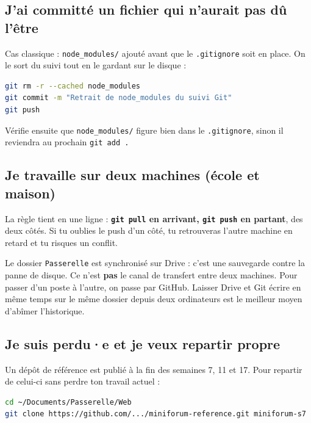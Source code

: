 \documentclass[a4paper,11pt]{article}
\begin{document}
\subsection{J'ai committé un fichier qui n'aurait pas dû l'être}

Cas classique : \texttt{node\_modules/} ajouté avant que le \texttt{.gitignore} soit en place. On le sort du suivi tout en le gardant sur le disque :

\begin{lstlisting}[language=bash]
git rm -r --cached node_modules
git commit -m "Retrait de node_modules du suivi Git"
git push
\end{lstlisting}

Vérifie ensuite que \texttt{node\_modules/} figure bien dans le \texttt{.gitignore}, sinon il reviendra au prochain \texttt{git add .}

\subsection{Je travaille sur deux machines (école et maison)}

La règle tient en une ligne : \textbf{\texttt{git pull} en arrivant, \texttt{git push} en partant}, des deux côtés. Si tu oublies le push d'un côté, tu retrouveras l'autre machine en retard et tu risques un conflit.

\begin{tcolorbox}[attention, title={Google Drive n'est pas Git}]
Le dossier \texttt{Passerelle} est synchronisé sur Drive : c'est une sauvegarde contre la panne de disque. Ce n'est \textbf{pas} le canal de transfert entre deux machines. Pour passer d'un poste à l'autre, on passe par GitHub. Laisser Drive et Git écrire en même temps sur le même dossier depuis deux ordinateurs est le meilleur moyen d'abîmer l'historique.
\end{tcolorbox}

\subsection{Je suis perdu·e et je veux repartir propre}

Un dépôt de référence est publié à la fin des semaines 7, 11 et 17. Pour repartir de celui-ci sans perdre ton travail actuel :

\begin{lstlisting}[language=bash]
cd ~/Documents/Passerelle/Web
git clone https://github.com/.../miniforum-reference.git miniforum-s7
\end{lstlisting}
\end{document}

